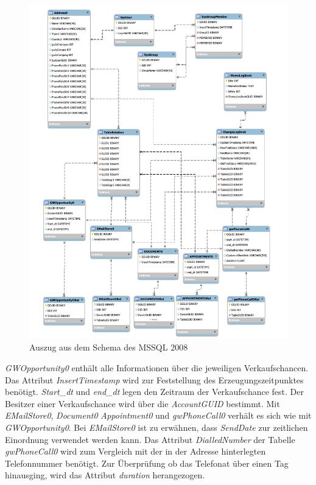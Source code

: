 \begin{figure}[H]
	\centering
  \includegraphics[width=1.0\textwidth]{pics/schema_alt.pdf}
	\caption{Auszug aus dem Schema des MSSQL 2008}
	\label{gw_schema_alt}
\end{figure}

\textit{GWOpportunity0} enthält alle Informationen über die jeweiligen Verkaufschancen. Das Attribut \textit{InsertTimestamp} wird zur Feststellung des Erzeugungszeitpunktes benötigt. \textit{Start\_dt} und \textit{end\_dt} legen den Zeitraum der Verkaufschance fest. Der Besitzer einer Verkaufschance wird über die \textit{AccountGUID} bestimmt. Mit \textit{EMailStore0}, \textit{Document0} \textit{Appointment0} und \textit{gwPhoneCall0} verhält es sich wie mit \textit{GWOpportunity0}. Bei \textit{EMailStore0} ist zu erwähnen, dass \textit{SendDate} zur zeitlichen Einordnung verwendet werden kann. Das Attribut \textit{DialledNumber} der Tabelle \textit{gwPhoneCall0} wird zum Vergleich  mit der in der Adresse hinterlegten Telefonnummer benötigt. Zur Überprüfung ob das Telefonat über einen Tag hinausging, wird das Attribut \textit{duration} herangezogen.

